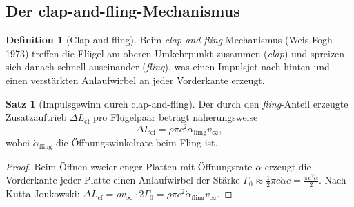 ﻿\documentclass[a4paper,12pt]{article}
\theoremstyle{definition}
\newtheorem{definition}{Definition}
\newtheorem{satz}{Satz}
\begin{document}
	\subsection{Der clap-and-fling-Mechanismus}
	
	\begin{definition}[Clap-and-fling]
		Beim \textit{clap-and-fling}-Mechanismus (Weis-Fogh 1973) treffen die Flügel am
		oberen Umkehrpunkt zusammen (\textit{clap}) und spreizen sich danach schnell auseinander
		(\textit{fling}), was einen Impulsjet nach hinten und einen verstärkten Anlaufwirbel
		an jeder Vorderkante erzeugt.
	\end{definition}
	
	\begin{satz}[Impulsgewinn durch clap-and-fling]
		\label{satz:clap}
		Der durch den \textit{fling}-Anteil erzeugte Zusatzauftrieb $\Delta L_{\mathrm{cf}}$
		pro Flügelpaar beträgt näherungsweise
		\[
		\Delta L_{\mathrm{cf}} = \rho \pi c^2 \dot{\alpha}_{\mathrm{fling}} v_\infty,
		\]
		wobei $\dot{\alpha}_{\mathrm{fling}}$ die Öffnungswinkelrate beim Fling ist.
	\end{satz}
	
	\begin{proof}
		Beim Öffnen zweier enger Platten mit Öffnungsrate $\dot{\alpha}$ erzeugt die
		Vorderkante jeder Platte einen Anlaufwirbel der Stärke
		$\Gamma_0 \approx \frac{1}{2}\pi c \dot{\alpha} c = \frac{\pi c^2 \dot{\alpha}}{2}$.
		Nach Kutta-Joukowski: $\Delta L_{\mathrm{cf}} = \rho v_\infty \cdot 2\Gamma_0
		= \rho \pi c^2 \dot{\alpha}_{\mathrm{fling}} v_\infty$.
	\end{proof}
	
\end{document}
